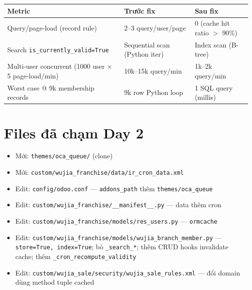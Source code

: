 \begin{longtable}{p{4cm} p{4cm} p{6cm}}
\toprule
\textbf{Metric} & \textbf{Trước fix} & \textbf{Sau fix} \\
\midrule
\endhead
Query/page-load (record rule) & 2--3 query/user/page & 0 (cache hit ratio $>$ 90\%) \\
Search \texttt{is\_currently\_valid=True} & Sequential scan (Python iter) & Index scan (B-tree) \\
Multi-user concurrent (1000 user × 5 page-load/min) & 10k--15k query/min & 1k--2k query/min \\
Worst case @ 9k membership records & 9k row Python loop & 1 SQL query (millis) \\
\bottomrule
\end{longtable}

\section{Files đã chạm Day 2}

\begin{itemize}
    \item Mới: \texttt{themes/oca\_queue/} (clone)
    \item Mới: \texttt{custom/wujia\_franchise/data/ir\_cron\_data.xml}
    \item Edit: \texttt{config/odoo.conf} — \texttt{addons\_path} thêm \texttt{themes/oca\_queue}
    \item Edit: \texttt{custom/wujia\_franchise/\_\_manifest\_\_.py} — data thêm cron
    \item Edit: \texttt{custom/wujia\_franchise/models/res\_users.py} — \texttt{ormcache}
    \item Edit: \texttt{custom/wujia\_franchise/models/wujia\_branch\_member.py} — \texttt{store=True, index=True}; bỏ \texttt{\_search\_*}; thêm CRUD hooks invalidate cache; thêm \texttt{\_cron\_recompute\_validity}
    \item Edit: \texttt{custom/wujia\_sale/security/wujia\_sale\_rules.xml} — đổi domain dùng method tuple cached
\end{itemize}

